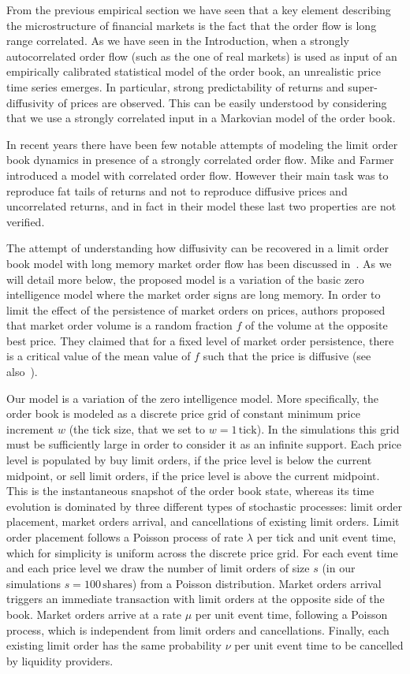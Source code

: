 \documentclass[12pt]{iopart}
\begin{document}
From the previous empirical section we have seen that a key element describing the microstructure of financial markets is the fact that the order flow is long range correlated. As we have seen in the Introduction, when a strongly autocorrelated order flow (such as the one of real markets) is used as input of an empirically calibrated statistical model of the order book, an unrealistic price time series emerges. In particular, strong predictability of returns and super-diffusivity of prices are observed. This can be easily understood by considering that we use a strongly correlated input in a Markovian model of the order book. 

In recent years there have been few notable attempts of modeling the limit order book dynamics in presence of a strongly correlated order flow. Mike and Farmer~\cite{mike2008empirical} introduced a model with correlated order flow. However their main task was to reproduce fat tails of returns and not to reproduce diffusive prices and uncorrelated returns, and in fact in their model these last two properties are not verified. 

The attempt of understanding how diffusivity can be recovered in a limit order book model with long memory market order flow has been discussed in~\cite{toth2011anomalous}. As we will detail more below, the proposed model is a variation of the basic zero intelligence model where the market order signs are long memory. In order to limit the effect of the persistence of market orders on prices, authors proposed that market order volume is a random fraction $f$ of the volume at the opposite best price. They claimed that for a fixed level of market order persistence, there is a critical value of the mean value of $f$ such that the price is diffusive (see also~\cite{mastromatteo2013agent}). 

Our model is a variation of the zero intelligence model. More specifically, the order book is modeled as a discrete price grid of constant minimum price increment $w$ (the tick size, that we set to $w=1\,\mathrm{tick}$). In the simulations this grid must be sufficiently large in order to consider it as an infinite support. Each price level is populated by buy limit orders, if the price level is below the current midpoint, or sell limit orders, if the price level is above the current midpoint. This is the instantaneous snapshot of the order book state, whereas its time evolution is dominated by three different types of stochastic processes: limit order placement, market orders arrival, and cancellations of existing limit orders. Limit order placement follows a Poisson process of rate $\lambda$ per tick and unit event time, which for simplicity is uniform across the discrete price grid. For each event time and each price level we draw the number of limit orders of size $s$ (in our simulations $s=100\,\mathrm{shares}$) from a Poisson distribution. Market orders arrival triggers an immediate transaction with limit orders at the opposite side of the book. Market orders arrive at a rate $\mu$ per unit event time, following a Poisson process, which is independent from limit orders and cancellations. Finally, each existing limit order has the same probability $\nu$ per unit event time to be cancelled by liquidity providers.
\end{document}
